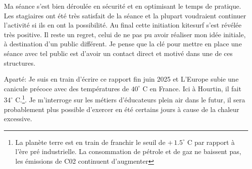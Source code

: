 \documentclass[11pt,a4paper]{report}
\begin{document}
Ma séance s'est bien déroulée en sécurité et en optimisant 
le temps de pratique. Les stagiaires ont été très satisfait de la 
séance et la plupart voudraient continuer l'activité si ils en 
ont la possibilité. 
Au final cette initiation kitesurf s'est révélée très positive.
Il reste un regret, celui de ne pas pu avoir réaliser mon idée initiale, 
à destination d'un public différent. Je pense que la clé pour
mettre en place une séance avec tel public est d'avoir un contact
direct et motivé dans une de ces structures.

Aparté: Je suis en train d'écrire ce rapport fin juin 2025 et L’Europe subie
une canicule précoce avec des températures de $40^{\circ}$ C en France. Ici à Hourtin, 
il fait $34^{\circ}$ C.\footnote{
La planète terre est en train de franchir le seuil  de  $+\, 1.5^{\circ}$ C par rapport
 à l'ère pré industrielle. La consommation de pétrole et de gaz ne baissent pas, les 
émissions de C02 continuent d'augmenter\cite{giec}}.
Je m'interroge sur les métiers d'éducateurs plein air dans le futur, il sera
probablement plus possible d'exercer en été certains jours
à cause de la chaleur excessive.






\appendix
\appendixpage
\addappheadtotoc
\end{document}
